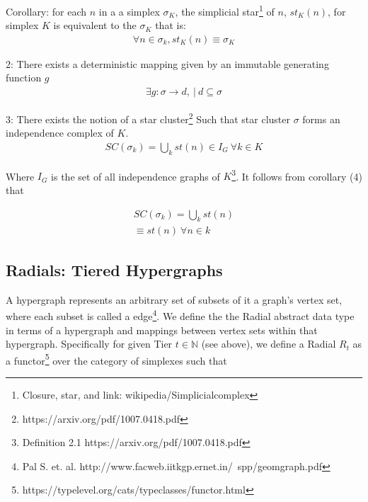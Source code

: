 \documentclass{article}
\begin{document}
Corollary: for each $n$ in a a simplex $\sigma_K$, the simplicial star\footnote{Closure, star, and link: wikipedia/Simplicialcomplex} of $n$, $st_K(n)$, for simplex $K$ is equivalent to the $\sigma_K$ that is:
\begin{equation} \label{eq1}
\begin{split}
\forall n \in \sigma_k, st_K(n) \equiv \sigma_K
\end{split}
\end{equation}

2: There exists a deterministic mapping given by an immutable generating function $g$
\begin{equation} \label{eq1}
\begin{split}
\exists g: \sigma \rightarrow d, \ | \ d \subseteq \sigma
\end{split}
\end{equation}

3: There exists the notion of a star cluster\footnote{https://arxiv.org/pdf/1007.0418.pdf} Such that star cluster $\sigma$ forms an independence complex of $K$.
\begin{equation} \label{eq1}
\begin{split}
SC(\sigma_k) = \bigcup_k st(n) \in I_G \ \forall k \in K
\end{split}
\end{equation}

Where $I_G$ is the set of all independence graphs of $K$\footnote{Definition 2.1 https://arxiv.org/pdf/1007.0418.pdf}. It follows from corollary (4) that

\begin{equation} \label{eq1}
\begin{split}
SC(\sigma_k) = \bigcup_k st(n) \\
\equiv st(n) \ \forall n \in k
\end{split}
\end{equation}

\subsection{Radials: Tiered Hypergraphs}
A hypergraph represents an arbitrary set of subsets of it a graph's vertex set, where each subset is called a edge\footnote{Pal S. et. al. http://www.facweb.iitkgp.ernet.in/~spp/geomgraph.pdf}. We define the the Radial abstract data type in terms of a hypergraph and mappings between vertex sets within that hypergraph. Specifically for given Tier $t \in \mathbb{N}$ (see above), we define a Radial $R_t$ as a functor\footnote{https://typelevel.org/cats/typeclasses/functor.html} over the category of simplexes such that
\end{document}

